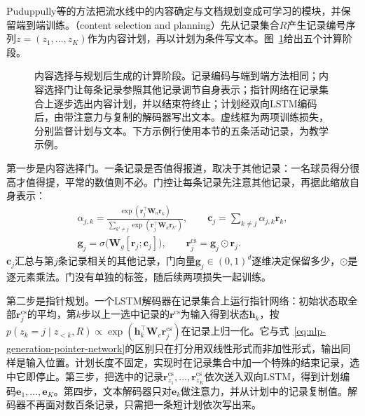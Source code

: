Puduppully等的方法把流水线中的内容确定与文档规划变成可学习的模块，并保留端到端训练。（content selection and planning）先从记录集合$R$产生记录编号序列$z=(z_1,\ldots,z_K)$作为内容计划，再以计划为条件写文本。图~\ref{fig:nlp-generation-content-planning}给出五个计算阶段。

\begin{figure}[tbp]
  \centering
  
  \caption{内容选择与规划后生成的计算阶段。记录编码与端到端方法相同；内容选择门让每条记录参照其他记录调节自身表示；指针网络在记录集合上逐步选出内容计划，并以结束符终止；计划经双向LSTM编码后，由带注意力与复制的解码器写出文本。虚线框为两项训练损失，分别监督计划与文本。下方示例行使用本节的五条活动记录，为教学示例。}
  \label{fig:nlp-generation-content-planning}
\end{figure}

第一步是内容选择门。一条记录是否值得报道，取决于其他记录：一名球员得分很高才值得提，平常的数值则不必。门控让每条记录先注意其他记录，再据此缩放自身表示：
\begin{equation}
  \begin{gathered}
  \alpha_{j,k}=\frac{\exp(\bm r_j^{\top}\bm W_a\bm r_k)}{\sum_{k'\neq j}\exp(\bm r_j^{\top}\bm W_a\bm r_{k'})},\qquad
  \bm c_j=\sum_{k\neq j}\alpha_{j,k}\bm r_k,\\
  \bm g_j=\sigma\bigl(\bm W_g[\bm r_j;\bm c_j]\bigr),\qquad
  \bm r^{\mathrm{cs}}_j=\bm g_j\odot\bm r_j .
  \end{gathered}
  \label{eq:nlp-generation-content-gate}
\end{equation}
$\bm c_j$汇总与第$j$条记录相关的其他记录，门向量$\bm g_j\in(0,1)^d$逐维决定保留多少，$\odot$是逐元素乘法。门没有单独的标签，随后续两项损失一起训练。

第二步是指针规划。一个LSTM解码器在记录集合上运行指针网络：初始状态取全部$\bm r^{\mathrm{cs}}_j$的平均，第$k$步以上一选中记录的$\bm r^{\mathrm{cs}}$为输入得到状态$\bm h_k$，按$p(z_k=j\mid z_{<k},R)\propto\exp(\bm h_k^{\top}\bm W_c\bm r^{\mathrm{cs}}_j)$在记录上归一化。它与式~\eqref{eq:nlp-generation-pointer-network}的区别只在打分用双线性形式而非加性形式，输出同样是输入位置。计划长度不固定，实现时在记录集合中加一个特殊的结束记录，选中它即停止。第三步，把选中的记录$\bm r^{\mathrm{cs}}_{z_1},\ldots,\bm r^{\mathrm{cs}}_{z_K}$依次送入双向LSTM，得到计划编码$\bm e_1,\ldots,\bm e_K$。第四步，文本解码器只对$\bm e_k$做注意力，并从计划中的记录复制值。解码器不再面对数百条记录，只需把一条短计划依次写出来。

